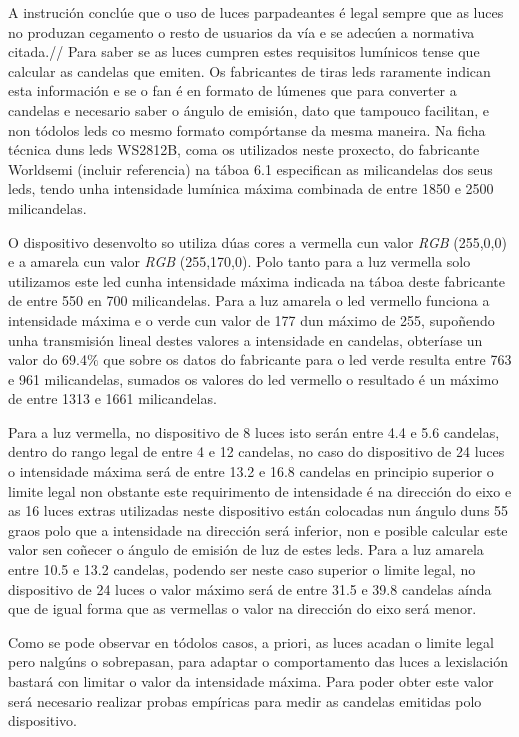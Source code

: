 A instrución conclúe que o uso de luces parpadeantes é legal sempre que as luces no produzan cegamento o resto de usuarios da vía e se adecúen a normativa citada.//
Para saber se as luces cumpren estes requisitos lumínicos tense que calcular as candelas que emiten. Os fabricantes de tiras leds raramente indican esta información e se o fan é en formato de lúmenes que para converter a candelas e necesario saber o ángulo de emisión, dato que tampouco facilitan, e non tódolos leds co mesmo formato compórtanse da mesma maneira. Na ficha técnica duns leds WS2812B, coma os utilizados neste proxecto, do fabricante Worldsemi (incluir referencia) na táboa 6.1 especifican as milicandelas dos seus leds, tendo unha intensidade lumínica máxima combinada de entre 1850 e 2500 milicandelas.

O dispositivo desenvolto so utiliza dúas cores a vermella cun valor \emph{RGB} (255,0,0) e a amarela cun valor \emph{RGB}  (255,170,0). Polo tanto para a luz vermella solo utilizamos este led cunha intensidade máxima indicada na táboa deste fabricante de entre 550 en 700 milicandelas. Para a luz amarela o led vermello funciona a intensidade máxima e o verde cun valor de 177 dun máximo de 255, supoñendo unha transmisión lineal destes valores a intensidade en candelas, obteríase un valor do 69.4\(\%\) que sobre os datos do fabricante para o led verde resulta entre 763 e 961 milicandelas, sumados os valores do led vermello o resultado é un máximo de entre 1313 e 1661 milicandelas.

Para a luz vermella, no dispositivo de 8 luces isto serán entre 4.4 e 5.6 candelas, dentro do rango legal de entre 4 e 12 candelas, no caso do dispositivo de 24 luces o intensidade máxima será de entre 13.2 e 16.8 candelas en principio superior o limite legal non obstante este requirimento de intensidade é na dirección do eixo e as 16 luces extras utilizadas neste dispositivo están colocadas nun ángulo duns 55 graos polo que a intensidade na dirección será inferior, non e posible calcular este valor sen coñecer o ángulo de emisión de luz de estes leds.
Para a luz amarela entre 10.5 e 13.2 candelas, podendo ser neste caso superior o limite legal, no dispositivo de 24 luces o valor máximo será de entre 31.5 e 39.8 candelas aínda que de igual forma que as vermellas o valor na dirección do eixo será menor.

Como se pode observar en tódolos casos, a priori, as luces acadan o limite legal pero nalgúns o sobrepasan, para adaptar o comportamento das luces a lexislación bastará con limitar o valor da intensidade máxima. Para poder obter este valor será necesario realizar probas empíricas para medir as candelas emitidas polo dispositivo.

